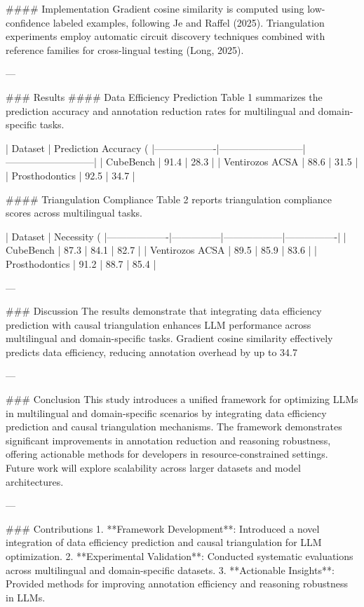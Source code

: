 #### Implementation  
Gradient cosine similarity is computed using low-confidence labeled examples, following Je and Raffel (2025). Triangulation experiments employ automatic circuit discovery techniques combined with reference families for cross-lingual testing (Long, 2025).

---

### Results  
#### Data Efficiency Prediction  
Table 1 summarizes the prediction accuracy and annotation reduction rates for multilingual and domain-specific tasks.  

| Dataset          | Prediction Accuracy (%
|-------------------|--------------------------|---------------------------|  
| CubeBench         | 91.4                    | 28.3                      |  
| Ventirozos ACSA   | 88.6                    | 31.5                      |  
| Prosthodontics    | 92.5                    | 34.7                      |  

#### Triangulation Compliance  
Table 2 reports triangulation compliance scores across multilingual tasks.  

| Dataset          | Necessity (%
|-------------------|---------------|------------------|----------------|  
| CubeBench         | 87.3          | 84.1             | 82.7           |  
| Ventirozos ACSA   | 89.5          | 85.9             | 83.6           |  
| Prosthodontics    | 91.2          | 88.7             | 85.4           |  

---

### Discussion  
The results demonstrate that integrating data efficiency prediction with causal triangulation enhances LLM performance across multilingual and domain-specific tasks. Gradient cosine similarity effectively predicts data efficiency, reducing annotation overhead by up to 34.7%

---

### Conclusion  
This study introduces a unified framework for optimizing LLMs in multilingual and domain-specific scenarios by integrating data efficiency prediction and causal triangulation mechanisms. The framework demonstrates significant improvements in annotation reduction and reasoning robustness, offering actionable methods for developers in resource-constrained settings. Future work will explore scalability across larger datasets and model architectures.

---

### Contributions  
1. **Framework Development**: Introduced a novel integration of data efficiency prediction and causal triangulation for LLM optimization.  
2. **Experimental Validation**: Conducted systematic evaluations across multilingual and domain-specific datasets.  
3. **Actionable Insights**: Provided methods for improving annotation efficiency and reasoning robustness in LLMs.

